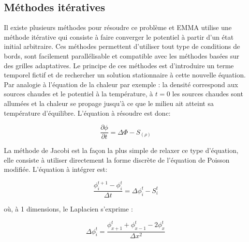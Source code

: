 \subsection{Méthodes itératives}


Il existe plusieurs méthodes pour résoudre ce problème et EMMA utilise une méthode itérative qui consiste à faire converger le potentiel à partir d'un état initial arbitraire. 
Ces méthodes permettent d'utiliser tout type de conditions de bords, sont facilement parallélisable et compatible avec les méthodes basées sur des grilles adaptatives.
Le principe de ces méthodes est d'introduire un terme temporel fictif et de rechercher un solution stationnaire à cette nouvelle équation.
Par analogie à l'équation de la chaleur par exemple : la densité correspond aux sources chaudes et le potentiel à la température, à $t=0$ les sources chaudes sont allumées et la chaleur se propage jusqu'à ce que le milieu ait atteint sa température d'équilibre. 
L'équation à résoudre est donc:

\begin{equation}
\dfrac{\partial \phi}{\partial t} = \Delta \Phi -S_{(\rho)}
\end{equation}

La méthode de Jacobi est la façon la plus simple de relaxer ce type d'équation, elle consiste à utiliser directement la forme discrète de l'équation de Poisson modifiée. 
L'équation à intégrer est:

\begin{equation}
\dfrac{\phi^{t+1}_i - \phi^{t}_i}{\Delta t}  =  \Delta \phi_i^t - S_i^t
\end{equation}

où, à 1 dimensions, le Laplacien s'exprime :

\begin{equation}
\Delta \phi_i^t = \dfrac{\phi_{x+1}^t  + \phi_{x-1}^t- 2\phi_{x}^t}{\Delta x ^2}
\end{equation}
		

